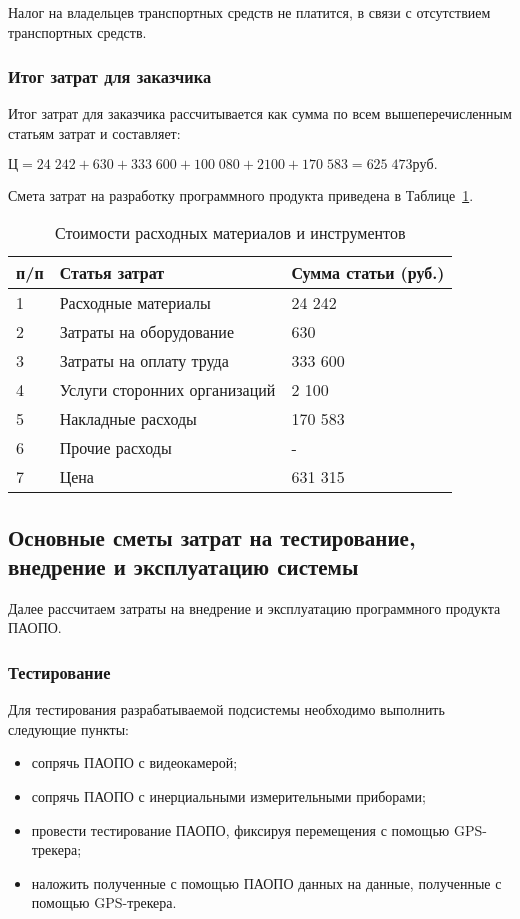 Налог на владельцев транспортных средств не платится, в связи с отсутствием транспортных средств. 

\subsubsection{Итог затрат для заказчика}

Итог затрат для заказчика рассчитывается как сумма по всем вышеперечисленным статьям затрат и составляет:

$Ц = 24 \; 242+ 630 + 333 \; 600  + 100 \; 080  + 2100 + 170 \; 583   =  625 \; 473  руб.$

Смета затрат на разработку программного продукта приведена в Таблице~\ref{tab:c}.

\begin{table}[htb]
	\caption{Стоимости расходных материалов и инструментов}\label{tab:c}
    \centering
        \begin{tabular}{|l|l|l|}
        		\hline
        		\textnumero п/п & Статья затрат & Сумма статьи (руб.) \\
        		\hline
        		1 & Расходные материалы & 24 242 \\
        		\hline
        		2  & Затраты на оборудование & 630 \\
        		\hline
        		3  & Затраты на оплату труда & 333 600 \\
        		\hline
        		4  & Услуги сторонних организаций & 2 100 \\
        		\hline
        		5  &  Накладные расходы & 170 583 \\
        		\hline
        		6 & Прочие расходы & - \\
        		\hline
        		7 & Цена & 631 315 \\
        		\hline
        \end{tabular}   		
\end{table}


\subsection{Основные сметы затрат на тестирование, внедрение и эксплуатацию системы}

Далее рассчитаем затраты на внедрение и эксплуатацию программного продукта ПАОПО.

\subsubsection{Тестирование}
Для тестирования разрабатываемой подсистемы необходимо выполнить следующие пункты:
\begin{itemize}
\item сопрячь ПАОПО с видеокамерой;
\item сопрячь ПАОПО с инерциальными измерительными приборами;
\item провести тестирование ПАОПО, фиксируя перемещения с помощью GPS-трекера;
\item наложить полученные с помощью ПАОПО данных на данные, полученные с помощью GPS-трекера.
\end{itemize}

